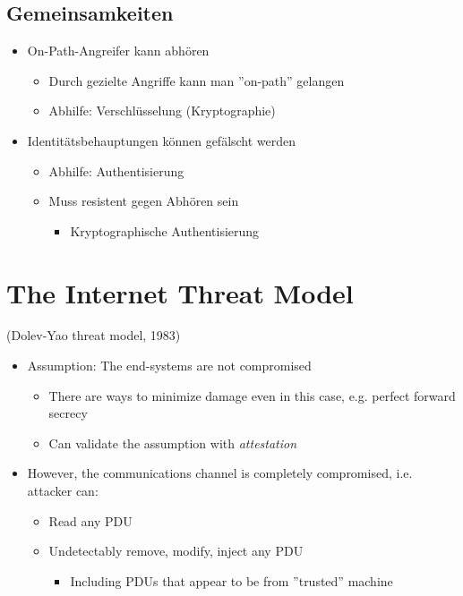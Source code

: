 \documentclass[openany]{book}
\begin{document}
\subsection{Gemeinsamkeiten}

\begin{itemize}
    \item On-Path-Angreifer kann abhören
    \begin{itemize}
        \item Durch gezielte Angriffe kann man ''on-path'' gelangen
        \item Abhilfe: Verschlüsselung (Kryptographie)
    \end{itemize}
    \item Identitätsbehauptungen können gefälscht werden
    \begin{itemize}
        \item Abhilfe: Authentisierung
        \item Muss resistent gegen Abhören sein
        \begin{itemize}
            \item Kryptographische Authentisierung
        \end{itemize}
    \end{itemize}
\end{itemize}

\section{The Internet Threat Model}

(Dolev-Yao threat model, 1983)

\begin{itemize}
    \item Assumption: The end-systems are not compromised
    \begin{itemize}
        \item There are ways to minimize damage even in this case, e.g. perfect forward secrecy
        \item Can validate the assumption with \textit{attestation}
    \end{itemize}
    \item However, the communications channel is completely compromised, i.e. attacker can:
    \begin{itemize}
        \item Read any PDU
        \item Undetectably remove, modify, inject any PDU
        \begin{itemize}
            \item Including PDUs that appear to be from ''trusted'' machine
        \end{itemize}
    \end{itemize}
\end{itemize}
\end{document}
